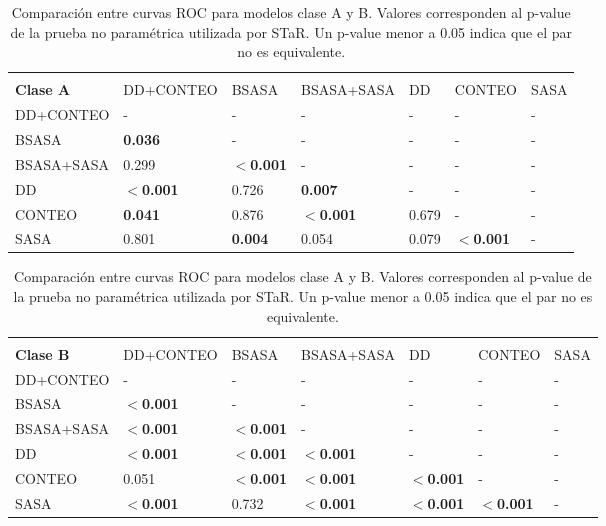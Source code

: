 \begin{table}[!htp]
\begin{tabular}{p{70pt} p{70pt} p{40pt} p{70pt} p{30pt} p{40pt} p{30pt}}
\hline \\
\textbf{Clase A}& DD+CONTEO  & BSASA         & BSASA+SASA & DD    & CONTEO   & SASA \\
DD+CONTEO       & -          & -             & -          & -     & -        & -    \\
BSASA           & \textbf{0.036}      & -             & -          & -     & -        & -    \\
BSASA+SASA      & 0.299      & \textbf{$<$0.001}      & -          & -     & -        & -    \\
DD              & \textbf{$<$0.001}   & 0.726         & \textbf{0.007}      & -     & -        & -    \\
CONTEO          & \textbf{0.041}      & 0.876         & \textbf{$<$0.001}   & 0.679 & -        & -    \\
SASA            & 0.801      & \textbf{0.004}         & 0.054      & 0.079 & \textbf{$<$0.001} & -    \\
\hline
\end{tabular}
\begin{tabular}{p{70pt} p{70pt} p{40pt} p{70pt} p{30pt} p{40pt} p{30pt}}
\hline \\
\textbf{Clase B}& DD+CONTEO & BSASA    & BSASA+SASA & DD       & CONTEO   & SASA \\
DD+CONTEO       & -         & -        & -          & -        & -        & -    \\
BSASA           & \textbf{$<$0.001}  & -        & -          & -        & -        & -    \\
BSASA+SASA      & \textbf{$<$0.001}  & \textbf{$<$0.001} & -          & -        & -        & -    \\
DD              & \textbf{$<$0.001}  & \textbf{$<$0.001} & \textbf{$<$0.001}   & -        & -        & -    \\
CONTEO          & 0.051     & \textbf{$<$0.001} & \textbf{$<$0.001}   & \textbf{$<$0.001} & -        & -    \\
SASA            & \textbf{$<$0.001}  & 0.732    & \textbf{$<$0.001}   & \textbf{$<$0.001} & \textbf{$<$0.001} & -    \\
\hline
\end{tabular}
\caption[Comparación entre curvas ROC de los potenciales para proteínas en detección de residuos mal modelados clase A y B]{Comparación entre curvas ROC para modelos clase A y B. Valores corresponden al p-value de la prueba no paramétrica utilizada por STaR. Un p-value menor a 0.05 indica que el par no es equivalente.}
\label{table:f2007res}
\end{table}

